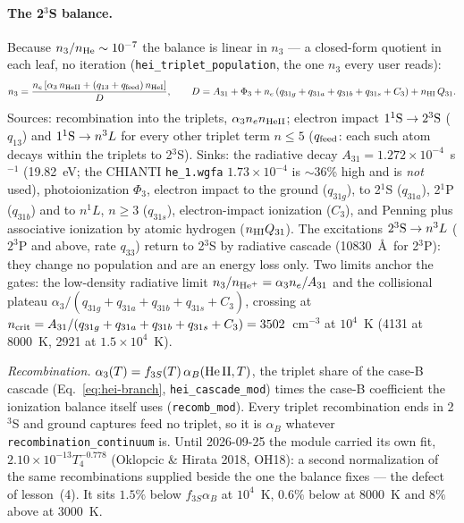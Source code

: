 \documentclass[english,a4paper]{my_memo}
\newcommand{\code}[1]{\texttt{#1}}
\begin{document}
\paragraph{The 2$^3$S balance.}  Because $n_3/n_{\rm He}\sim10^{-7}$ the
balance is linear in $n_3$ --- a closed-form quotient in each leaf, no
iteration (\code{hei\_triplet\_population}, the one $n_3$ every user reads):
\begin{equation}
n_3 = \frac{n_e\,[\alpha_3\,n_{\rm HeII} + (q_{13}+q_{\rm feed})\,n_{\rm HeI}]}
           {D},\qquad
D = A_{31} + \Phi_3 + n_e\,(q_{31g}+q_{31a}+q_{31b}+q_{31s}+C_3) + n_{\rm HI}\,Q_{31}.
\label{eq:heimeta}
\end{equation}
Sources: recombination into the triplets, $\alpha_3 n_e n_{\rm HeII}$; electron
impact $1^1{\rm S}\rightarrow2^3{\rm S}$ ($q_{13}$) and
$1^1{\rm S}\rightarrow n^3L$ for every other triplet term $n\le5$
($q_{\rm feed}$: each such atom decays within the triplets to 2$^3$S).  Sinks:
the radiative decay $A_{31} = 1.272{\times}10^{-4}$~s$^{-1}$ (19.82~eV; the
CHIANTI \code{he\_1.wgfa} $1.73{\times}10^{-4}$ is $\sim$36\% high and is
\emph{not} used), photoionization $\Phi_3$, electron impact to the ground
($q_{31g}$), to 2$^1$S ($q_{31a}$), 2$^1$P ($q_{31b}$) and to $n^1L$,
$n\ge3$ ($q_{31s}$), electron-impact ionization ($C_3$), and Penning plus
associative ionization by atomic hydrogen ($n_{\rm HI}Q_{31}$).  The
excitations $2^3{\rm S}\rightarrow n^3L$ ($2^3$P and above, rate $q_{33}$)
return to 2$^3$S by radiative cascade (10830~\AA\ for 2$^3$P): they change no
population and are an energy loss only.  Two limits anchor the gates: the
low-density radiative limit $n_3/n_{\rm He^+} = \alpha_3 n_e/A_{31}$ and the
collisional plateau $\alpha_3/(q_{31g}+q_{31a}+q_{31b}+q_{31s}+C_3)$, crossing
at $n_{\rm crit} = A_{31}/(q_{31g}+q_{31a}+q_{31b}+q_{31s}+C_3) = 3502$~cm$^{-3}$
at $10^4$~K (4131 at 8000~K, 2921 at $1.5{\times}10^4$~K).

\emph{Recombination.}  $\alpha_3(T) = f_{3S}(T)\,\alpha_B({\rm He\,II},T)$,
the triplet share of the case-B cascade (Eq.~\ref{eq:hei-branch},
\code{hei\_cascade\_mod}) times the case-B coefficient the ionization balance
itself uses (\code{recomb\_mod}).  Every triplet recombination ends in
2$^3$S and ground captures feed no triplet, so it is $\alpha_B$ whatever
\code{recombination\_continuum} is.  Until 2026-09-25 the module carried its own fit,
$2.10{\times}10^{-13}T_4^{-0.778}$ (Oklopcic \& Hirata 2018, OH18): a second
normalization of the same recombinations supplied beside the one the balance
fixes --- the defect of lesson~(4).  It sits $1.5\%$ below
$f_{3S}\alpha_B$ at $10^4$~K, $0.6\%$ below at 8000~K and $8\%$ above at
3000~K.
\end{document}
